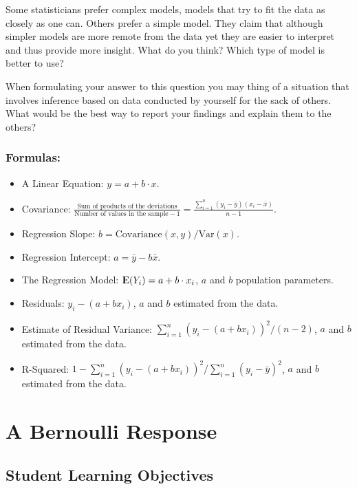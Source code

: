 \documentclass[]{krantz}
\newcommand{\Expec}{{\rm I\kern-.3em E}}
\theoremstyle{definition}
\theoremstyle{definition}
\theoremstyle{definition}
\theoremstyle{remark}
\begin{document}
Some statisticians prefer complex models, models that try to fit the
data as closely as one can. Others prefer a simple model. They claim
that although simpler models are more remote from the data yet they are
easier to interpret and thus provide more insight. What do you think?
Which type of model is better to use?

When formulating your answer to this question you may thing of a
situation that involves inference based on data conducted by yourself
for the sack of others. What would be the best way to report your
findings and explain them to the others?

\subsection*{Formulas:}\label{formulas}


\begin{itemize}
\item
  A Linear Equation: \(y = a + b \cdot x\).
\item
  Covariance:
  \(\frac{\mbox{Sum of products of the deviations}}{\mbox{Number of values in the sample}-1} = \frac{\sum_{i=1}^n (y_i-\bar y)(x_i - \bar x)}{n-1}\).
\item
  Regression Slope: \(b = \mbox{Covariance}(x,y)/\mbox{Var}(x)\).
\item
  Regression Intercept: \(a = \bar y - b\bar x\).
\item
  The Regression Model: \(\Expec(Y_i) = a + b \cdot x_i\), \(a\) and
  \(b\) population parameters.
\item
  Residuals: \(y_i - (a + bx_i)\), \(a\) and \(b\) estimated from the
  data.
\item
  Estimate of Residual Variance:
  \(\sum_{i=1}^n(y_i - (a + bx_i))^2/(n-2)\), \(a\) and \(b\) estimated
  from the data.
\item
  R-Squared:
  \(1 - \sum_{i=1}^n(y_i - (a + bx_i))^2/\sum_{i=1}^n(y_i - \bar y)^2\),
  \(a\) and \(b\) estimated from the data.
\end{itemize}

\chapter{A Bernoulli Response}\label{ChapLogistic}

\section{Student Learning
Objectives}\label{student-learning-objectives-9}
\end{document}

